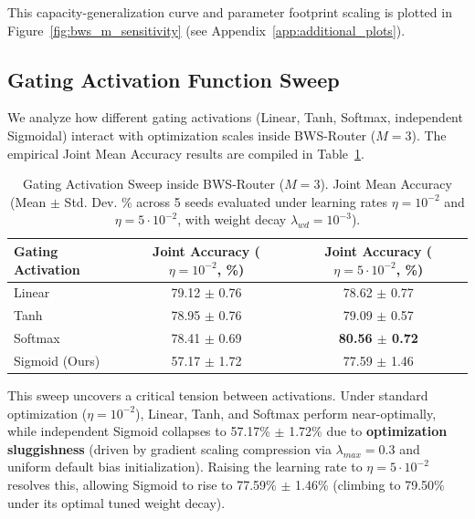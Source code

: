 This capacity-generalization curve and parameter footprint scaling is plotted in Figure~\ref{fig:bws_m_sensitivity} (see Appendix~\ref{app:additional_plots}).

\subsection{Gating Activation Function Sweep}
We analyze how different gating activations (Linear, Tanh, Softmax, independent Sigmoidal) interact with optimization scales inside BWS-Router ($M=3$). The empirical Joint Mean Accuracy results are compiled in Table~\ref{tab:activation_sweep}.

\begin{table}[h]
\caption{Gating Activation Sweep inside BWS-Router ($M=3$). Joint Mean Accuracy (Mean $\pm$ Std. Dev. \% across 5 seeds evaluated under learning rates $\eta = 10^{-2}$ and $\eta = 5 \cdot 10^{-2}$, with weight decay $\lambda_{wd} = 10^{-3}$).}
\label{tab:activation_sweep}
\vskip 0.1in
\begin{center}
\begin{small}
\setlength{\tabcolsep}{3pt}
\begin{tabular}{lcc}
\toprule
\textbf{Gating Activation} & \textbf{Joint Accuracy ($\eta = 10^{-2}$, \%)} & \textbf{Joint Accuracy ($\eta = 5 \cdot 10^{-2}$, \%)} \\
\midrule
Linear & 79.12 $\pm$ 0.76 & 78.62 $\pm$ 0.77 \\
Tanh & 78.95 $\pm$ 0.76 & 79.09 $\pm$ 0.57 \\
Softmax & 78.41 $\pm$ 0.69 & \textbf{80.56 $\pm$ 0.72} \\
Sigmoid (Ours) & 57.17 $\pm$ 1.72 & 77.59 $\pm$ 1.46 \\
\bottomrule
\end{tabular}
\end{small}
\end{center}
\vskip -0.1in
\end{table}

This sweep uncovers a critical tension between activations. Under standard optimization ($\eta = 10^{-2}$), Linear, Tanh, and Softmax perform near-optimally, while independent Sigmoid collapses to 57.17\% $\pm$ 1.72\% due to \textbf{optimization sluggishness} (driven by gradient scaling compression via $\lambda_{max} = 0.3$ and uniform default bias initialization). Raising the learning rate to $\eta = 5 \cdot 10^{-2}$ resolves this, allowing Sigmoid to rise to 77.59\% $\pm$ 1.46\% (climbing to 79.50\% under its optimal tuned weight decay). 


